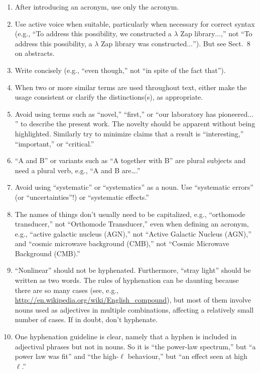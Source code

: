\documentclass[letterpaper,11pt]{article}
\begin{document}
\begin{enumerate}
\item After introducing an acronym, use only the acronym.

\item Use active voice when suitable, particularly when necessary for correct
syntax (e.g., ``To address this possibility, we constructed a $\lambda$ Zap
library$\ldots$,'' not ``To address this possibility, a $\lambda$ Zap library
was constructed$\ldots$'').  But see Sect.~8 on abstracts.

\item Write concisely (e.g., ``even though,'' not ``in spite of the fact
that'').

\item When two or more similar terms are used throughout text, either make
the usage consistent or clarify the distinctions(s), as appropriate.

\item Avoid using terms such as ``novel,'' ``first,'' or ``our laboratory has
pioneered$\ldots$'' to describe the present work.  The novelty should be
apparent without being highlighted.  Similarly try to minimize claims that a
result is ``interesting,'' ``important,'' or ``critical.''

\item ``A and B'' or variants such as ``A together with B'' are plural
subjects and need a plural verb, e.g., ``A and B are\dots.''

\item Avoid using ``systematic'' or ``systematics'' as a noun.
Use ``systematic errors'' (or ``uncertainties''!) or ``systematic effects.'' 

\item The names of things don't usually need to be capitalized, e.g.,
``orthomode transducer,'' not ``Orthomode Transducer,'' even when defining an
acronym, e.g., ``active galactic nucleus (AGN),'' not ``Active Galactic
Nucleus (AGN),''
and ``cosmic microwave background (CMB),'' not
``Cosmic Microwave Background (CMB).''

\item ``Nonlinear''
should not be hyphenated.  
Furthermore, ``stray light'' should be written as two words.
The rules of hyphenation can be daunting because there are so many cases
(see, e.g., \url{http://en.wikipedia.org/wiki/English_compound}), but most of them
involve nouns used as adjectives in multiple combinations, affecting a
relatively small number of cases.  If in doubt, don't hyphenate.

\item
One hyphenation guideline is clear, namely that a hyphen is included
in adjectival phrases but not in nouns.  So it is ``the power-law spectrum,''
but ``a power law was fit'' and ``the high-$\ell$ behaviour,'' but
``an effect seen at high $\ell$.''


\end{enumerate}
\end{document}
